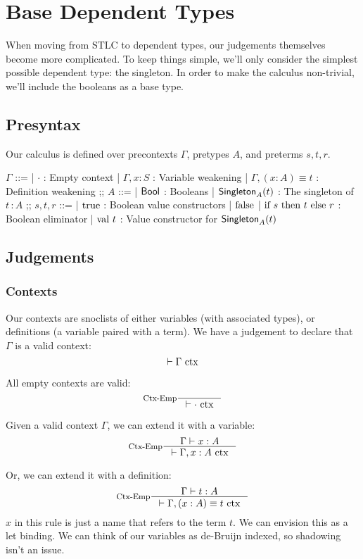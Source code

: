 \section{Base Dependent Types}
When moving from STLC to dependent types, our judgements themselves become more complicated.
To keep things simple, we'll only consider the simplest possible dependent type: the singleton.
In order to make the calculus non-trivial, we'll include the booleans as a base type.

\subsection{Presyntax}
Our calculus is defined over precontexts $\Gamma$, pretypes $A$, and preterms $s, t, r$.

\begin{bnf}
$\Gamma$ ::=
  | $\cdot$ : Empty context
  | $\Gamma, x \colon S$ : Variable weakening
  | $\Gamma, (x \colon A) \equiv t$ : Definition weakening
;;
$A$ ::=
  | $\textsf{Bool}$ : Booleans
  | $\textsf{Singleton}_{A}(t)$ : The singleton of $t \,\colon A$
;;
$s, t, r$ ::=
| $\textrm{true}$ : Boolean value constructors
| $\textrm{false}$
| $\textrm{if } s \textrm{ then } t \textrm{ else } r$ : Boolean eliminator
| $\textrm{val } t$ : Value constructor for $\textsf{Singleton}_{A}(t)$
\end{bnf}


\subsection{Judgements}
\subsubsection{Contexts}
Our contexts are snoclists of either variables (with associated types), or definitions (a variable paired with a term).
We have a judgement to declare that $\Gamma$ is a valid context:
\[
  \vdash \Gamma \textrm{ ctx}
\]

All empty contexts are valid:
\[
  \inference[Ctx-Emp]{}{\vdash \ctx{\cdot}}
\]

Given a valid context $\Gamma$, we can extend it with a variable:
\[
  \inference[Ctx-Emp]
  {\Gamma \vdash x : A}
  {\vdash \ctx{\Gamma, x : A}}
\]

Or, we can extend it with a definition:
\[
  \inference[Ctx-Emp]
  {\Gamma \vdash t : A}
  {\vdash \ctx{\Gamma, (x : A) \equiv t}}
\]
$x$ in this rule is just a name that refers to the term $t$.
We can envision this as a let binding.
We can think of our variables as de-Bruijn indexed, so shadowing isn't an issue.

